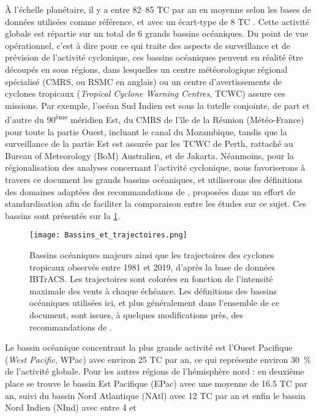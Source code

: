 \documentclass[../main.tex]{subfiles}
\begin{document}
À l'échelle planétaire, il y a entre \numrange[range-phrase ={ et }]{82}{85} TC par an en moyenne selon les bases de données utilisées comme référence, et avec
un écart-type de \num{8} TC \parencite{schreck_impact_2014}. Cette activité globale est répartie sur un total de \num{6} grands bassins océaniques. Du point de
vue opérationnel, c'est à dire pour ce qui traite des aspects de surveillance et de prévision de l'activité cyclonique, ces bassins océaniques peuvent en
réalité être découpés en sous régions, dans lesquelles un centre météorologique régional spécialisé (CMRS, ou RSMC en anglais) ou un centre d'avertissements de
cyclones tropicaux (\textit{Tropical Cyclone Warning Centres}, TCWC) assure ces missions. Par exemple, l'océan Sud Indien est sous la tutelle conjointe, de part
et d'autre du 90\textsuperscript{ème} méridien Est, du CMRS de l'île de la Réunion (Météo-France) pour toute la partie Ouest, incluant le canal du Mozambique,
tandis que la surveillance de la partie Est est assurée par les TCWC de Perth, rattaché au Bureau of Meteorology (BoM) Australien, et de Jakarta. Néanmoins,
pour la régionalisation des analyses concernant l'activité cyclonique, nous favoriserons à travers ce document les grands bassins océaniques, et utiliserons des
définitions des domaines adaptées des recommandations de \cite{knutson_tropical_2020}, proposées dans un effort de standardisation afin de faciliter la
comparaison entre les études sur ce sujet. Ces bassins sont présentés sur la \cref{fig:bassins_TC}.
%
\begin{figure}[t]
    \centering
    \texttt{[image: Bassins\_et\_trajectoires.png]}
    \caption{Bassins océaniques majeurs ainsi que les trajectoires des cyclones tropicaux observés entre 1981 et 2019, d'après la base de données
    \hbox{IBTrACS}. Les trajectoires sont colorées en fonction de l'intensité maximale des vents à chaque échéance. Les définitions des bassins océaniques
    utilisées ici, et plus généralement dans l'ensemble de ce document, sont issues, à quelques modifications près, des recommandations de \hbox{\cite[documents
    supplémentaires]{knutson_tropical_2020}}.}
    \label{fig:bassins_TC}
\end{figure}
%
Le bassin océanique concentrant la plus grande activité est l'Ouest Pacifique (\textit{West Pacific}, WPac) avec environ \num{25} TC par an, ce qui représente
environ \SI{30}{\percent} de l'activité globale. Pour les autres régions de l'hémisphère nord : en deuxième place se trouve le bassin Est Pacifique (EPac) avec
une moyenne de \num{16.5} TC par an, suivi du bassin Nord Atlantique (NAtl) avec \num{12} TC par an et enfin le bassin Nord Indien (NInd) avec entre \num{4} et
\end{document}
